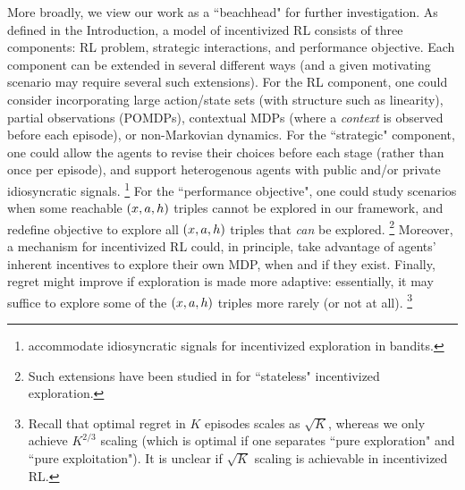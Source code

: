 More broadly, we view our work as a ``beachhead" for further investigation. As defined in the Introduction, a model of incentivized RL consists of three components: RL problem,  strategic interactions, and performance objective. Each component can be extended in several different ways (and a given motivating scenario may require several such extensions). For the RL component, one could consider incorporating large action/state sets (with structure such as linearity), partial observations (\ie POMDPs), contextual MDPs (where a \emph{context} is observed before each episode), or non-Markovian dynamics. For the ``strategic" component, one could allow the agents to revise their choices before each stage (rather than once per episode), and support heterogenous agents with public and/or private idiosyncratic signals.%
\footnote{\citet{Jieming-multitypes18} accommodate idiosyncratic signals for incentivized exploration in bandits.} For the ``performance objective", one could study scenarios when some reachable $(x,a,h)$ triples cannot be explored in our framework, and redefine \traversal objective to explore all $(x,a,h)$ triples that \emph{can} be explored.%
\footnote{Such extensions have been studied in \cite{ICexplorationGames-ec16,Jieming-multitypes18} for ``stateless" incentivized exploration.} Moreover, a mechanism for incentivized RL could, in principle, take advantage of agents' inherent incentives to explore their own MDP, when and if they exist. Finally, regret might improve if exploration is made more adaptive: essentially, it may suffice to explore some of the $(x,a,h)$ triples more rarely (or not at all).%
\footnote{Recall that optimal regret in $K$ episodes scales as $\sqrt{K}$, whereas we only achieve $K^{2/3}$ scaling (which is optimal if one separates ``pure exploration" and ``pure exploitation"). It is unclear if $\sqrt{K}$ scaling is achievable in incentivized RL.}

